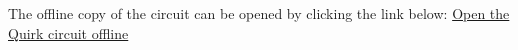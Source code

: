 The offline copy of the circuit can be opened by clicking the link below:
\href{run:es4_quirk.html}{Open the Quirk circuit offline}